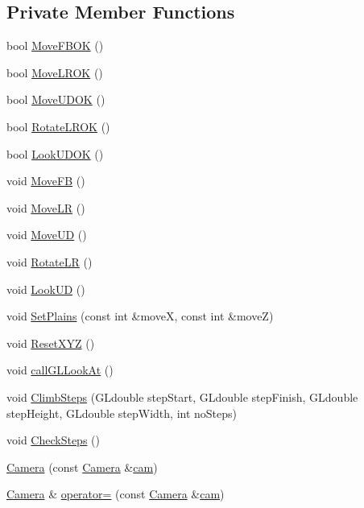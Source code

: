 \subsection*{Private Member Functions}
\begin{DoxyCompactItemize}
\item 
bool \hyperlink{class_camera_a8937b6b035801d1f698b40693c53d1e6}{Move\+F\+B\+OK} ()
\item 
bool \hyperlink{class_camera_a4e500f9773f9f46a69e6a70d40d838bf}{Move\+L\+R\+OK} ()
\item 
bool \hyperlink{class_camera_a3bb636079c02cdb8ac235c157faa4556}{Move\+U\+D\+OK} ()
\item 
bool \hyperlink{class_camera_a5c352dbad24a210bf0159e00f1dfe8b8}{Rotate\+L\+R\+OK} ()
\item 
bool \hyperlink{class_camera_a3b3f5cedfa0d89824ea52f109bc3eba8}{Look\+U\+D\+OK} ()
\item 
void \hyperlink{class_camera_acc808e653e9c59f0d2450c9caca26b98}{Move\+FB} ()
\item 
void \hyperlink{class_camera_ad53c2248f2d38bc8f01ac288e8cc21d3}{Move\+LR} ()
\item 
void \hyperlink{class_camera_af14abc814d362ed9781db6725919f836}{Move\+UD} ()
\item 
void \hyperlink{class_camera_aff5a71068d0d6f82c5a03efe1c9be259}{Rotate\+LR} ()
\item 
void \hyperlink{class_camera_ae72895a4f32cdc88146bee6a1a3ea636}{Look\+UD} ()
\item 
void \hyperlink{class_camera_a62b9c31a39202f116f3b9fd774ef42e3}{Set\+Plains} (const int \&moveX, const int \&moveZ)
\item 
void \hyperlink{class_camera_a11d15ac81e6fbe74c1dd09e342be3e9c}{Reset\+X\+YZ} ()
\item 
void \hyperlink{class_camera_a023cb3e9d92301d8132f338c7ef5be77}{call\+G\+L\+Look\+At} ()
\item 
void \hyperlink{class_camera_ae1798d33c0a7379dc227cc18dc767732}{Climb\+Steps} (G\+Ldouble step\+Start, G\+Ldouble step\+Finish, G\+Ldouble step\+Height, G\+Ldouble step\+Width, int no\+Steps)
\item 
void \hyperlink{class_camera_aedb7c813456b1856f098a8733d7f4e1b}{Check\+Steps} ()
\item 
\hyperlink{class_camera_ac01065de99da2319fb5fd4fc1ba96ea3}{Camera} (const \hyperlink{class_camera}{Camera} \&\hyperlink{main_8cpp_a3b23650c3f80b53cee3a2c471797c732}{cam})
\item 
\hyperlink{class_camera}{Camera} \& \hyperlink{class_camera_a5a6ef1328b993f207ab51755e7d19341}{operator=} (const \hyperlink{class_camera}{Camera} \&\hyperlink{main_8cpp_a3b23650c3f80b53cee3a2c471797c732}{cam})
\end{DoxyCompactItemize}

